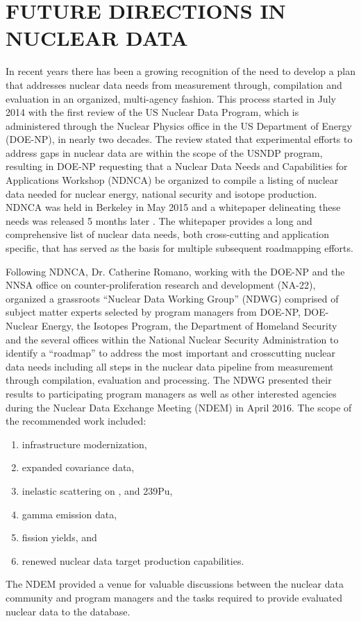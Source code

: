 \documentclass[letterpaper]{ar-1col}
\begin{document}
\section{FUTURE DIRECTIONS IN NUCLEAR DATA}

In recent years there has been a growing recognition of the need to develop a plan that addresses nuclear data needs from measurement through, compilation and evaluation in an organized, multi-agency fashion.
 This process started in July 2014 with the first review of the US Nuclear Data Program, which is administered through the Nuclear Physics office in the US Department of Energy (DOE-NP), in nearly two decades.
 The review stated that experimental efforts to address gaps in nuclear data are within the scope of the USNDP program, resulting in  DOE-NP requesting that a Nuclear Data Needs and Capabilities for Applications Workshop (NDNCA) be organized to compile a listing of nuclear data needed for nuclear energy, national security and isotope production.
 NDNCA was held in Berkeley in May 2015  and a whitepaper delineating these needs was released 5 months later \cite{bernstein2015nuclear}.
  The whitepaper provides a long and comprehensive list of nuclear data needs, both cross-cutting and application specific, that has served as the basis for multiple subsequent roadmapping efforts.

Following NDNCA, Dr. Catherine Romano, working with the DOE-NP and the NNSA office on counter-proliferation research and development (NA-22), organized a grassroots \enquote{Nuclear Data Working Group} (NDWG) comprised of subject matter experts selected by program managers from DOE-NP, DOE-Nuclear Energy, the Isotopes Program, the Department of Homeland Security and the several offices within the National Nuclear Security Administration to identify a \enquote{roadmap} to address the most important and crosscutting nuclear data needs including all steps in the nuclear data pipeline from measurement through compilation, evaluation and processing.
 The NDWG presented their results to participating program managers as well as other interested agencies during the Nuclear Data Exchange Meeting (NDEM) in April 2016.
 The scope of the recommended work included:
\begin{enumerate}
  \item infrastructure modernization, 
  \item expanded covariance data, 
  \item inelastic scattering on ,  and 239Pu, 
  \item gamma emission data, 
  \item fission yields, and 
  \item renewed nuclear data target production capabilities.
\end{enumerate}  
The NDEM provided a venue for valuable discussions between the nuclear data community and program managers and the tasks required to provide evaluated nuclear data to the database.  
\end{document}

